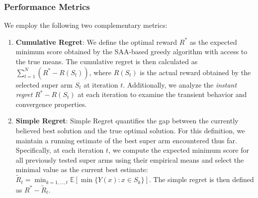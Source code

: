 \documentclass[opre,sglanonrev]{informs4}
\begin{document}
\subsubsection{Performance Metrics}

We employ the following two complementary metrics:

\begin{enumerate}
    \item \textbf{Cumulative Regret}: We define the optimal reward $R^*$ as the expected minimum score obtained by the SAA-based greedy algorithm with access to the true means. The cumulative regret is then calculated as $\sum_{t=1}^{N} (R^* - R(S_t))$, where $R(S_t)$ is the actual reward obtained by the selected super arm $S_t$ at iteration $t$. Additionally, we analyze the \textit{instant regret} $R^* - R(S_t)$ at each iteration to examine the transient behavior and convergence properties.

    \item \textbf{Simple Regret}: Simple Regret quantifies the gap between the currently believed best solution and the true optimal solution. For this definition, we maintain a running estimate of the best super arm encountered thus far. Specifically, at each iteration $t$, we compute the expected minimum score for all previously tested super arms using their empirical means and select the minimal value as the current best estimate: $\tilde{R}_t = \min_{k=1,\ldots,t} \mathbb{E}[\min\{Y(x) : x \in S_k\}]$. The simple regret is then defined as $R^* - \tilde{R}_t$.

\end{enumerate}
\end{document}
